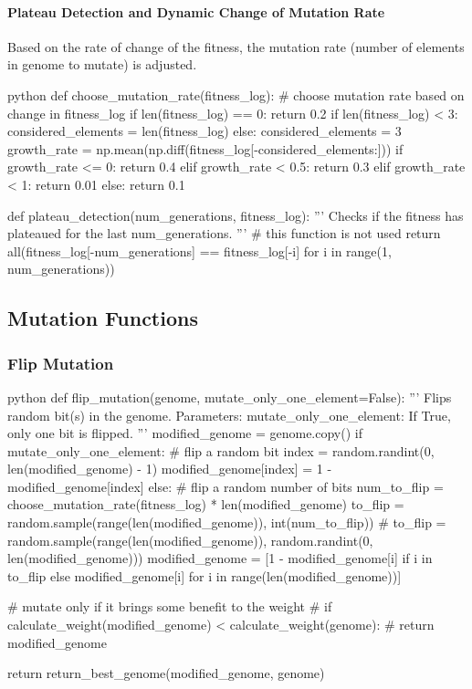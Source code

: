 \paragraph{Plateau Detection and Dynamic Change of Mutation Rate}

Based on the rate of change of the fitness, the mutation rate (number of elements in genome to mutate) is adjusted.

\begin{mintedbox}{python}
def choose_mutation_rate(fitness_log):
  # choose mutation rate based on change in fitness_log
  if len(fitness_log) == 0:
      return 0.2
  if len(fitness_log) < 3:
      considered_elements = len(fitness_log)
  else:
      considered_elements = 3
  growth_rate = np.mean(np.diff(fitness_log[-considered_elements:]))
  if growth_rate <= 0:
      return 0.4
  elif growth_rate < 0.5:
      return 0.3
  elif growth_rate < 1:
      return 0.01
  else:
      return 0.1

def plateau_detection(num_generations, fitness_log):
  '''
  Checks if the fitness has plateaued for the last num_generations.
  '''
  # this function is not used
  return all(fitness_log[-num_generations] == fitness_log[-i] for i in range(1, num_generations))
\end{mintedbox}

\subsection{Mutation Functions}

\subsubsection{Flip Mutation}

\begin{mintedbox}{python}
  def flip_mutation(genome, mutate_only_one_element=False):
    '''
    Flips random bit(s) in the genome.
    Parameters:
    mutate_only_one_element: If True, only one bit is flipped.
    '''
    modified_genome = genome.copy()
    if mutate_only_one_element:
        # flip a random bit
        index = random.randint(0, len(modified_genome) - 1)
        modified_genome[index] = 1 - modified_genome[index]
    else:
        # flip a random number of bits
        num_to_flip = choose_mutation_rate(fitness_log) * len(modified_genome)
        to_flip = random.sample(range(len(modified_genome)), int(num_to_flip))
        # to_flip = random.sample(range(len(modified_genome)), random.randint(0, len(modified_genome)))
        modified_genome = [1 - modified_genome[i] if i in to_flip else modified_genome[i] for i in range(len(modified_genome))]

    # mutate only if it brings some benefit to the weight
    # if calculate_weight(modified_genome) < calculate_weight(genome):
    #     return modified_genome

    return return_best_genome(modified_genome, genome)
\end{mintedbox}

